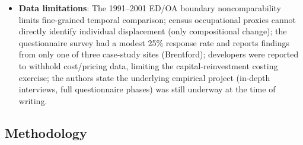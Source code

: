 \begin{itemize}
  \item \textbf{Data limitations}: The 1991--2001 ED/OA boundary noncomparability limits fine-grained temporal comparison; census occupational proxies cannot directly identify individual displacement (only compositional change); the questionnaire survey had a modest 25\% response rate and reports findings from only one of three case-study sites (Brentford); developers were reported to withhold cost/pricing data, limiting the capital-reinvestment costing exercise; the authors state the underlying empirical project (in-depth interviews, full questionnaire phases) was still underway at the time of writing.
\end{itemize}

\subsection*{Methodology}

